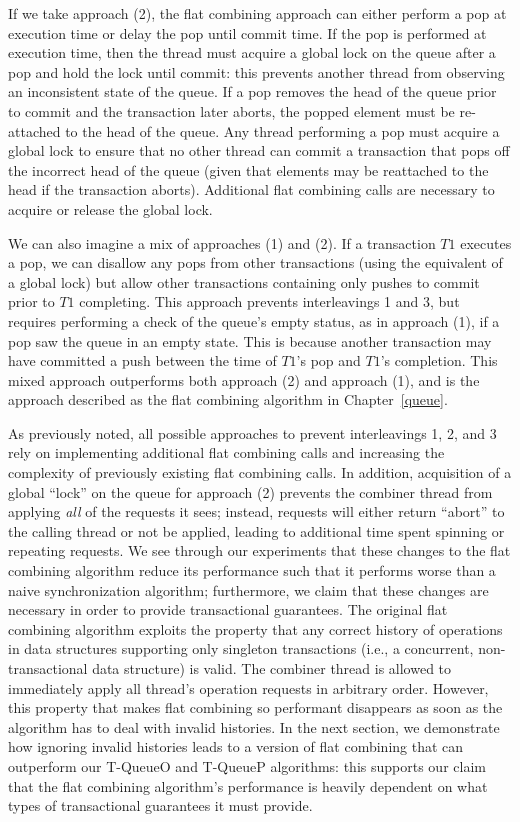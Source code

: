 If we take approach (2), the flat combining approach can either perform a pop at execution time or delay the pop until commit time. If the pop is performed at execution time, then the thread must acquire a global lock on the queue after a pop and hold the lock until commit: this prevents another thread from observing an inconsistent state of the queue. If a pop removes the head of the queue prior to commit and the transaction later aborts, the popped element must be re-attached to the head of the queue. Any thread performing a pop must acquire a global lock to ensure that no other thread can commit a transaction that pops off the incorrect head of the queue (given that elements may be reattached to the head if the transaction aborts). Additional flat combining calls are necessary to acquire or release the global lock. 

We can also imagine a mix of approaches (1) and (2). If a transaction $T1$ executes a pop, we can disallow any pops from other transactions (using the equivalent of a global lock) but allow other transactions containing only pushes to commit prior to $T1$ completing. This approach prevents interleavings 1 and 3, but requires performing a check of the queue's empty status, as in approach (1), if a pop saw the queue in an empty state. This is because another transaction may have committed a push between the time of $T1$'s pop and $T1$'s completion. This mixed approach outperforms both approach (2) and approach (1), and is the approach described as the flat combining algorithm in Chapter~\ref{queue}. 

As previously noted, all possible approaches to prevent interleavings 1, 2, and 3 rely on implementing additional flat combining calls and increasing the complexity of previously existing flat combining calls. In addition, acquisition of a global ``lock'' on the queue for approach (2) prevents the combiner thread from applying \emph{all} of the requests it sees; instead, requests will either return ``abort'' to the calling thread or not be applied, leading to additional time spent spinning or repeating requests. We see through our experiments that these changes to the flat combining algorithm reduce its performance such that it performs worse than a naive synchronization algorithm; furthermore, we claim that these changes are necessary in order to provide transactional guarantees. The original flat combining algorithm exploits the property that any correct history of operations in data structures supporting only singleton transactions (i.e., a concurrent, non-transactional data structure) is valid. The combiner thread is allowed to immediately apply all thread's operation requests in arbitrary order. However, this property that makes flat combining so performant disappears as soon as the algorithm has to deal with invalid histories. In the next section, we demonstrate how ignoring invalid histories leads to a version of flat combining that can outperform our T-QueueO and T-QueueP algorithms: this supports our claim that the flat combining algorithm's performance is heavily dependent on what types of transactional guarantees it must provide.
